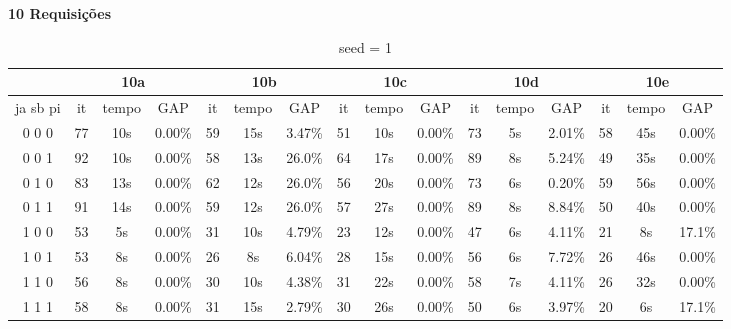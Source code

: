 \documentclass[12pt]{article}
\begin{document}
\begin{center}
\textbf{10 Requisi\c{c}\~oes}
\end{center}

\begin{table}[!htb]
\centering
\footnotesize
\begin{tabular}{|c||c|c|c||c|c|c||c|c|c||c|c|c||c|c|c|}
\cline{2-16}
\multicolumn{1}{c||}{} & \multicolumn{3}{c||}{10a} & \multicolumn{3}{c||}{10b} & \multicolumn{3}{c||}{10c} & \multicolumn{3}{c||}{10d} & \multicolumn{3}{c|}{10e}\\
\hline
ja sb pi & it & tempo & GAP & it & tempo & GAP & it & tempo & GAP & it & tempo & GAP & it & tempo & GAP \\
\hline
0 0 0 & 77 & 10s & 0.00\% & 59 & 15s & 3.47\% & 51 & 10s & 0.00\% & 73 & 5s & 2.01\% & 58 & 45s & 0.00\% \\
0 0 1 & 92 & 10s & 0.00\% & 58 & 13s & 26.0\% & 64 & 17s & 0.00\% & 89 & 8s & 5.24\% & 49 & 35s & 0.00\% \\
0 1 0 & 83 & 13s & 0.00\% & 62 & 12s & 26.0\% & 56 & 20s & 0.00\% & 73 & 6s & 0.20\% & 59 & 56s & 0.00\% \\
0 1 1 & 91 & 14s & 0.00\% & 59 & 12s & 26.0\% & 57 & 27s & 0.00\% & 89 & 8s & 8.84\% & 50 & 40s & 0.00\% \\
1 0 0 & 53 & 5s & 0.00\% & 31 & 10s & 4.79\% & 23 & 12s & 0.00\% & 47 & 6s & 4.11\% & 21 & 8s & 17.1\% \\
1 0 1 & 53 & 8s & 0.00\% & 26 & 8s & 6.04\% & 28 & 15s & 0.00\% & 56 & 6s & 7.72\% & 26 & 46s & 0.00\% \\
1 1 0 & 56 & 8s & 0.00\% & 30 & 10s & 4.38\% & 31 & 22s & 0.00\% & 58 & 7s & 4.11\% & 26 & 32s & 0.00\% \\
1 1 1 & 58 & 8s & 0.00\% & 31 & 15s & 2.79\% & 30 & 26s & 0.00\% & 50 & 6s & 3.97\% & 20 & 6s & 17.1\% \\
\hline
\end{tabular}
\caption{seed = 1}
\end{table}
\end{document}
